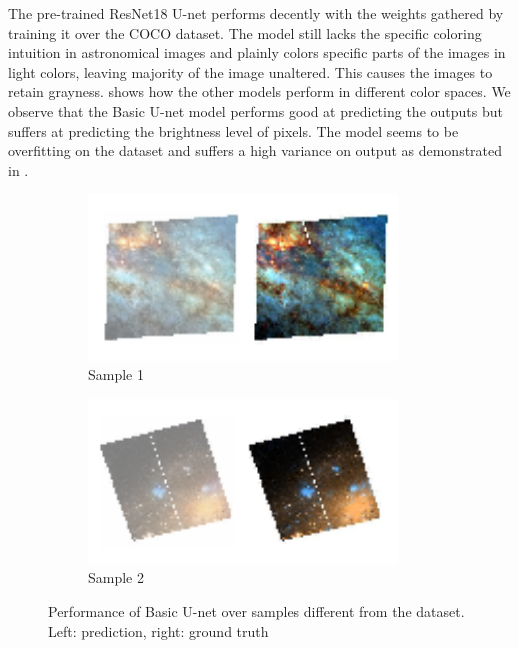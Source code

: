 \documentclass[10pt,twocolumn,letterpaper]{article}
\begin{document}
    \hspace*{0.167 in}The pre-trained ResNet18 U-net performs decently with the weights gathered by training it over the COCO dataset. The model still lacks the specific coloring intuition in astronomical images and plainly colors specific parts of the images in light colors, leaving majority of the image unaltered. This causes the images to retain grayness.
     shows how the other models perform in different color spaces. We observe that the Basic U-net model performs good at predicting the outputs but suffers at predicting the brightness level of pixels. The model seems to be overfitting on the dataset and suffers a high variance on output as demonstrated in .
    \begin{figure}[!htb]
    	\centering
    	\begin{subfigure}[b]{0.15\textwidth}
    		\centering
    		\includegraphics[width=0.9\textwidth]{figures/overfit_1}
    		\caption{Sample 1}
    		\label{fig: overfit1}
    	\end{subfigure}
    		\hspace{0.1 in}
    	\begin{subfigure}[b]{0.15\textwidth}
    		\centering
    		\includegraphics[width=0.9\textwidth]{figures/overfit_2}
    		\caption{Sample 2}
    		\label{fig: overfit2}
    	\end{subfigure}
    	\caption{Performance of Basic U-net over samples different from the dataset. Left: prediction, right: ground truth}
    	\label{fig: u-net_overfit}
    \end{figure}
    
\end{document}
